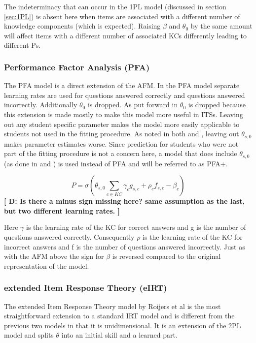 \documentclass{scrartcl}
\providecommand{\comm}[1]{{\bf[ #1 ]}}
\providecommand{\commd}[1]{\comm{D: {#1}}}
\begin{document}
The indeterminacy that can occur in the 1PL model (discussed in section \ref{sec:1PL}) is absent here when items are associated with a different number of knowledge components (which is expected). Raising $\beta$ and $\theta_{0}$ by the same amount will affect items with a different number of associated KCs differently leading to different Ps. 



\subsubsection{Performance Factor Analysis (PFA)}
The PFA model is a direct extension of the AFM. In the PFA model separate learning rates are used for questions answered correctly and questions answered incorrectly. Additionally $\theta_{0}$ is dropped. As put forward in \cite{pfa} $\theta_{0}$ is dropped because this extension is made mostly to make this model more useful in ITSs. Leaving out any student specific parameter makes the model more easily applicable to students not used in the fitting procedure. As noted in both \cite{ktpfa} and \cite{blackart}, leaving out $\theta_{s,0}$ makes parameter estimates worse. Since prediction for students who were not part of the fitting procedure is not a concern here, a model that does include $\theta_{s,0}$ (as done in \cite{ktpfa} and \cite{blackart}) is used instead of PFA and will be referred to as PFA+.

\begin{equation}
\label{eq:pfa}
P = \sigma(\theta_{s,0} \sum_{c \in KC}  \gamma_{c} g_{s,c} + \rho_{c} f_{s,c} - \beta_{c})
\end{equation}
\commd{Is there a minus sign missing here? same assumption as the last, but two different learning rates. }

Here $\gamma$ is the learning rate of the KC for correct answers and g is the number of questions answered correctly. Consequently $\rho$ is the learning rate of the KC for incorrect answers and f is the number of questions answered incorrectly. Just as with the AFM above the sign for $\beta$ is reversed compared to the original representation of the model.

\subsubsection{extended Item Response Theory (eIRT)}
\label{sec:eirt}
The extended Item Response Theory model by Roijers et al \cite{eirt} is the most straightforward extension to a standard IRT model and is different from the previous two models in that it is unidimensional. It is an extension of the 2PL model and splits $\theta$ into an initial skill and a learned part. 
\end{document}
